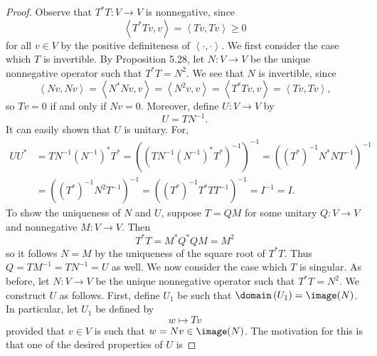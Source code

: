 \documentclass[linearalgebraII]{subfiles}
\begin{document}
    \begin{proof}
        Observe that $T^*T:V\to V$ is nonnegative, since
        \begin{equation*}
            \left\langle T^*Tv, v\right\rangle = \left\langle Tv, Tv\right\rangle \geq 0
        \end{equation*}
        for all $v\in V$ by the positive definiteness of $\left\langle \cdot, \cdot\right\rangle$. We first consider the case which $T$ is invertible. By Proposition 5.28, let $N:V\to V$ be the unique nonnegative operator such that $T^*T = N^2$. We see that $N$ is invertible, since
        \begin{equation*}
            \left\langle Nv, Nv\right\rangle = \left\langle N^*Nv, v\right\rangle = \left\langle N^2v, v\right\rangle = \left\langle T^*Tv, v\right\rangle = \left\langle Tv, Tv\right\rangle ,
        \end{equation*}
        so $Tv = 0$ if and only if $Nv = 0$. Moreover, define $U:V\to V$ by
        \begin{equation*}
            U = TN^{-1}.
        \end{equation*}
        It can easily shown that $U$ is unitary. For,
        \begin{align*}
            UU^* & = TN^{-1}\left( N^{-1} \right)^*T^* = \left( \left( TN^{-1}\left( N^{-1} \right) ^*T^* \right) ^{-1} \right) ^{-1} = \left( \left( T^* \right) ^{-1}N^*NT^{-1} \right) ^{-1} \\
                 & = \left( \left( T^* \right) ^{-1}N^2T^{-1} \right) ^{-1} = \left( \left( T^* \right)^{-1}T^*TT^{-1} \right) ^{-1} = I^{-1} = I.
        \end{align*} 
        To show the uniqueness of $N$ and $U$, suppose $T=QM$ for some unitary $Q:V\to V$ and nonnegative $M:V\to V$. Then
        \begin{equation*}
            T^*T = M^*Q^*QM = M^{2}
        \end{equation*}
        so it follows $N=M$ by the uniqueness of the square root of $T^*T$. Thus $Q=TM^{-1}=TN^{-1} = U$ as well. We now consider the case which $T$ is singular. As before, let $N:V\to V$ be the unique nonnegative operator such that $T^*T = N^2$. We construct $U$ as follows. First, define $U_1$ be such that $\domain\left( U_1 \right) = \image(N)$. In particular, let $U_1$ be defined by
        \begin{equation*}
            w\mapsto Tv
        \end{equation*}
        provided that $v\in V$ is such that $w=Nv\in\image(N)$. The motivation for this is that one of the desired properties of $U$ is 

\end{proof}
\end{document}
